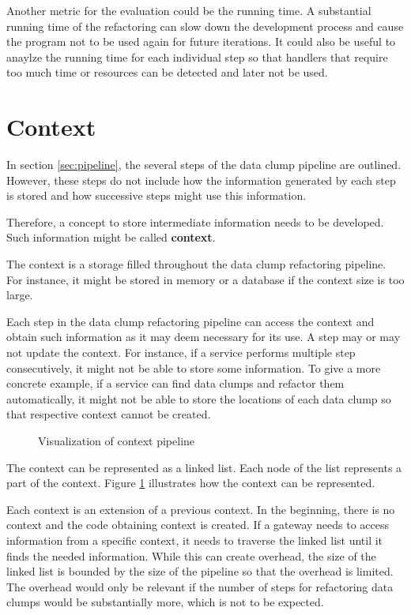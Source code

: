 Another metric for the evaluation could be the running time. A substantial running time of the refactoring can slow down the development process and cause the program not to be used again for future iterations. It could also be useful to anaylze the running time for each individual step so that handlers that require too much time or resources can be detected and later not be used. 

\section{Context}\label{sec:context}
In section \ref{sec:pipeline}, the several steps of the data clump pipeline are outlined. However, these steps do not include how the information generated by each step is stored and how successive steps might use this information.

Therefore, a concept to store intermediate information needs to be developed. Such information might be called \textbf{context}.

The context is a storage filled throughout the data clump refactoring pipeline. For instance, it might be stored in memory or a database if the context size is too large.

Each step in the data clump refactoring pipeline can access the context and obtain such information as it may deem necessary for its use. A step may or may not update the context. For instance, if a service performs multiple step consecutively, it might not be able to store some information. To give a more concrete example, if a service can find data clumps and refactor them automatically, it might not be able to store the locations of each data clump so that respective context cannot be created. 

\begin{figure}
    \centering
    
    \caption{Visualization of context pipeline}
    \label{fig:context_pipeline}
\end{figure}

The context can be represented as a linked list. Each node of the list represents a part of the context. Figure \ref{fig:context_pipeline} illustrates how the context can be  represented.

Each context is an extension of a previous context. In the beginning, there is no context and the code obtaining context is created. If a gateway needs to access information from a specific context, it needs to traverse the linked list until it finds the needed information. While this can create overhead, the size of the linked list is bounded by the size of the pipeline so that the overhead is limited.  The overhead would only be relevant if the number of steps for refactoring data clumps would be substantially more, which is not to be expected. 

